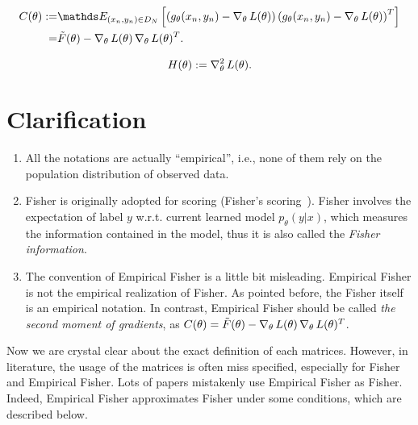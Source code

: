 \documentclass{article}
\begin{document}
\begin{defi}
\begin{equation*}
    \begin{aligned}
        C(\theta) :=& \Ebb_{(x_n,y_n)\in D_N} \left[ \left(g_{\theta}(x_n,y_n) - \grad_{\theta}L(\theta) \right)\left(g_{\theta}(x_n,y_n) - \grad_{\theta}L(\theta) \right)^T \right] \\
        =& \tilde{F}(\theta) - \grad_{\theta}L(\theta) \grad_{\theta}L(\theta)^T.
    \end{aligned}
\end{equation*}
\end{defi}

\begin{defi}[Hessian]
\begin{equation*}
    H(\theta):= \operatorname{\nabla}_{\theta}^2 L(\theta).
\end{equation*}
\end{defi}

\section{Clarification}
\begin{enumerate}
    \item All the notations are actually ``empirical'', i.e., none of them rely on the population distribution of observed data.
    \item Fisher is originally adopted for scoring (Fisher's scoring~\cite{longford1987fast}). Fisher involves the expectation of label $y$ w.r.t. current learned model $p_{\theta}(y|x)$, which measures the information contained in the model, thus it is also called the \emph{Fisher information}.
    \item The convention of Empirical Fisher is a little bit misleading. Empirical Fisher is not the empirical realization of Fisher. As pointed before, the Fisher itself is an empirical notation.
    In contrast, Empirical Fisher should be called \emph{the second moment of gradients}, as $C(\theta) = \tilde{F}(\theta) - \operatorname{\nabla}_{\theta}L(\theta) \operatorname{\nabla}_{\theta}L(\theta)^T$.
\end{enumerate}

Now we are crystal clear about the exact definition of each matrices. However, in literature, the usage of the matrices is often miss specified, especially for Fisher and Empirical Fisher. Lots of papers mistakenly use Empirical Fisher as Fisher. 
Indeed, Empirical Fisher approximates Fisher under some conditions, which are described below.
\end{document}
